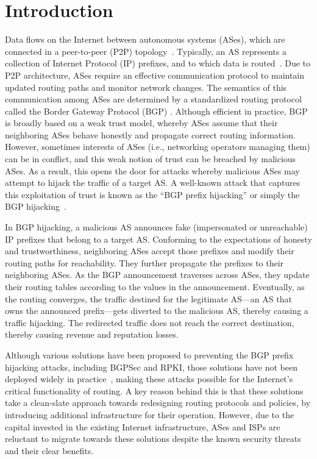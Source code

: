 \documentclass[5p]{elsarticle}
\begin{document}
\section{Introduction}\label{sec:introduction}
Data flows on the Internet between autonomous systems (ASes), which are connected in a peer-to-peer (P2P) topology~\cite{SpotoGM14,KanzakiF13}. Typically, an AS represents a collection of Internet Protocol (IP) prefixes, and to which data is routed~\cite{PadmanabhanL2001}. Due to P2P architecture, ASes require an effective communication protocol to maintain updated routing paths and monitor network changes. The semantics of this communication among ASes are determined by a standardized routing protocol called the Border Gateway Protocol (BGP) \cite{SermpezisKDD18}. Although efficient in practice, BGP is broadly based on a weak trust model, whereby ASes assume that their neighboring ASes behave honestly and propagate correct routing information. However, sometimes interests of ASes (i.e., networking operators managing them) can be in conflict, and this weak notion of trust can be breached by malicious ASes. As a result, this opens the door for attacks whereby malicious ASes may attempt to hijack the traffic of a target AS. A well-known attack that captures this exploitation of trust is known as the ``BGP prefix hijacking'' or simply the BGP hijacking~\cite{MitsevaPE18,JonkerPDS18}. 

In BGP hijacking, a malicious AS announces fake (impersonated or unreachable) IP prefixes that belong to a target AS. Conforming to the expectations of honesty and trustworthiness, neighboring ASes accept those prefixes and modify their routing paths for reachability. They further propagate the prefixes to their neighboring ASes. As the BGP announcement traverses across ASes, they update their routing tables according to the values in the announcement. Eventually, as the routing converges, the traffic destined for the legitimate AS---an AS that owns the announced prefix---gets diverted to the malicious AS, thereby causing a traffic hijacking. The redirected traffic does not reach the correct destination, thereby causing revenue and reputation losses. 



Although various solutions have been proposed to preventing the BGP prefix hijacking attacks, including BGPSec and RPKI, those solutions have not been deployed widely in practice~\cite{QiuGRN07}, making these attacks possible for the Internet's critical functionality of routing. A key reason behind this is that these solutions take a clean-slate approach towards redesigning routing protocols and policies, by introducing additional infrastructure for their operation. However, due to the capital invested in the existing Internet infrastructure, ASes and ISPs are reluctant to migrate towards these solutions despite the known security threats and their clear benefits. 
\end{document}
